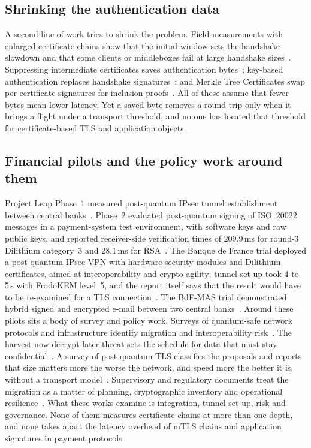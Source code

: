\documentclass[preprint,12pt]{elsarticle}
\newcommand{\ms}{\,ms\xspace}
\begin{document}
\subsection{Shrinking the authentication data}
\label{sec:related-shrink}
A second line of work tries to shrink the problem. Field measurements with enlarged certificate chains show that the initial window sets the handshake slowdown and that some clients or middleboxes fail at large handshake sizes~\cite{westerbaan2021}. Suppressing intermediate certificates saves authentication bytes~\cite{kampanakis2022}; key-based authentication replaces handshake signatures~\cite{schwabe2020}; and Merkle Tree Certificates swap per-certificate signatures for inclusion proofs~\cite{mtcdraft}. All of these assume that fewer bytes mean lower latency. Yet a saved byte removes a round trip only when it brings a flight under a transport threshold, and no one has located that threshold for certificate-based TLS and application objects.

\subsection{Financial pilots and the policy work around them}
\label{sec:related-field}
Project Leap Phase~1 measured post-quantum IPsec tunnel establishment between central banks~\cite{bis_leap2023}. Phase~2 evaluated post-quantum signing of ISO~20022 messages in a payment-system test environment, with software keys and raw public keys, and reported receiver-side verification times of 209.9\ms for round-3 Dilithium category~3 and 28.1\ms for RSA~\cite{bis_leap2025}. The Banque de France trial deployed a post-quantum IPsec VPN with hardware security modules and Dilithium certificates, aimed at interoperability and crypto-agility; tunnel set-up took 4 to 5\,s with FrodoKEM level~5, and the report itself says that the result would have to be re-examined for a TLS connection~\cite{bdf2022}. The BdF-MAS trial demonstrated hybrid signed and encrypted e-mail between two central banks~\cite{bdfmas2024}. Around these pilots sits a body of survey and policy work. Surveys of quantum-safe network protocols and infrastructure identify migration and interoperability risk~\cite{baseri2024,baseri2026}. The harvest-now-decrypt-later threat sets the schedule for data that must stay confidential~\cite{baradziej2026}. A survey of post-quantum TLS classifies the proposals and reports that size matters more the worse the network, and speed more the better it is, without a transport model~\cite{alnahawi2024}. Supervisory and regulatory documents treat the migration as a matter of planning, cryptographic inventory and operational resilience~\cite{g7qtwg2026,andriani2024,dora2022,janciute2025}. What these works examine is integration, tunnel set-up, risk and governance. None of them measures certificate chains at more than one depth, and none takes apart the latency overhead of mTLS chains and application signatures in payment protocols.
\end{document}
